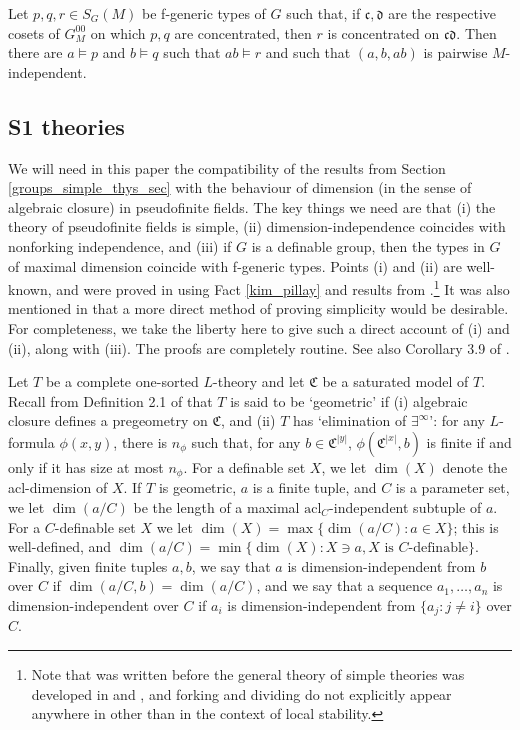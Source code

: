 \documentclass[10pt]{article}
\begin{document}
{\begin{fact}\label{pq=r}
Let $p,q,r\in S_G(M)$ be f-generic types of $G$ such that, if $\mathfrak{c},\mathfrak{d}$ are the respective cosets of $G^{00}_M$ on which $p,q$ are concentrated, then $r$ is concentrated on $\mathfrak{c}\mathfrak{d}$. Then there are $a\models p$ and $b\models q$ such that $ab\models r$ and such that $(a,b,ab)$ is pairwise $M$-independent.
\end{fact}


\subsection{S1 theories}\label{s1_section}
We will need in this paper the compatibility of the results from Section \ref{groups_simple_thys_sec} with the behaviour of dimension (in the sense of algebraic closure) in pseudofinite fields. The key things we need are that (i) the theory of pseudofinite fields is simple, (ii) dimension-independence coincides with nonforking independence, and (iii) if $G$ is a definable group, then the types in $G$ of maximal dimension coincide with f-generic types. Points (i) and (ii) are well-known, and were proved in \cite{kim_pillay} using Fact \ref{kim_pillay} and results from \cite{hrushovski_pillay}.\footnote[1]{Note that \cite{hrushovski_pillay} was written before the general theory of simple theories was developed in \cite{kim} and \cite{kim_pillay}, and forking and dividing do not explicitly appear anywhere in \cite{hrushovski_pillay} other than in the context of local stability.} It was also mentioned in \cite{kim_pillay} that a more direct method of proving simplicity would be desirable. For completeness, we take the liberty here to give such a direct account of (i) and (ii), along with (iii). The proofs are completely routine. See also Corollary 3.9 of \cite{elwes_macpherson}.

Let $T$ be a complete one-sorted $L$-theory and let $\mathfrak{C}$ be a saturated model of $T$. Recall from Definition 2.1 of \cite{hrushovski_pillay} that $T$ is said to be `geometric' if (i) algebraic closure defines a pregeometry on $\mathfrak{C}$, and (ii) $T$ has `elimination of $\exists^\infty$': for any $L$-formula $\phi(x,y)$, there is $n_\phi$ such that, for any $b\in\mathfrak{C}^{|y|}$, $\phi(\mathfrak{C}^{|x|},b)$ is finite if and only if it has size at most $n_\phi$. For a definable set $X$, we let $\dim(X)$ denote the acl-dimension of $X$. If $T$ is geometric, $a$ is a finite tuple, and $C$ is a parameter set, we let $\dim(a/C)$ be the length of a maximal $\mathrm{acl}_C$-independent subtuple of $a$. For a $C$-definable set $X$ we let $\dim(X)=\max\{\dim(a/C):a\in X\}$; this is well-defined, and $\dim(a/C)=\min\{\dim(X):X\ni a,X\text{ is }C\text{-definable}\}$. Finally, given finite tuples $a,b$, we say that $a$ is dimension-independent from $b$ over $C$ if $\dim(a/C,b)=\dim(a/C)$, and we say that a sequence $a_1,\dots,a_n$ is dimension-independent over $C$ if $a_i$ is dimension-independent from $\{a_j:j\neq i\}$ over $C$.


}
\end{document}
